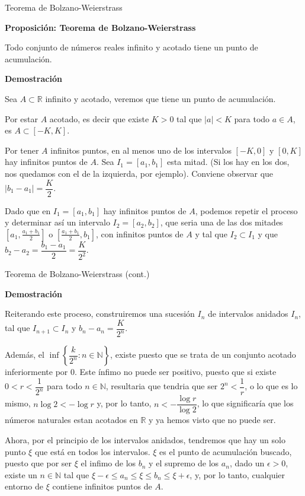\documentclass[
  ignorenonframetext,
]{beamer}
\begin{document}
\begin{frame}{Teorema de Bolzano-Weierstrass}
\protect\hypertarget{teorema-de-bolzano-weierstrass}{}

\textbf{Proposición: Teorema de Bolzano-Weierstrass}

Todo conjunto de números reales infinito y acotado tiene un punto de
acumulación.

\textbf{Demostración}

Sea \(A\subset \mathbb{R}\) infinito y acotado, veremos que tiene un
punto de acumulación.

Por estar \(A\) acotado, es decir que existe \(K>0\) tal que \(|a|<K\)
para todo \(a \in A\), es \(A \subset [-K,K]\).

Por tener \(A\) infinitos puntos, en al menos uno de los intervalos
\([-K,0]\) y \([0,K]\) hay infinitos puntos de \(A\). Sea
\(I_1 =[a_1,b_1]\) esta mitad. (Si los hay en los dos, nos quedamos con
el de la izquierda, por ejemplo). Conviene observar que
\(|b_1-a_1|=\dfrac{K}{2}\).

Dado que en \(I_1 =[a_1,b_1]\) hay infinitos puntos de \(A\), podemos
repetir el proceso y determinar así un intervalo \(I_2 = [a_2,b_2]\),
que seria una de las dos mitades \([a_1, \frac{a_1+b_1}{2}]\) o
\([\frac{a_1+b_1}{2},b_1]\), con infinitos puntos de \(A\) y tal que
\(I_2 \subset I_1\) y que
\(b_2-a_2= \dfrac{b_1 - a_1}{2}= \dfrac{K}{2^2}\).

\end{frame}

\begin{frame}{Teorema de Bolzano-Weierstrass (cont.)}
\protect\hypertarget{teorema-de-bolzano-weierstrass-cont.}{}

\textbf{Demostración}

Reiterando este proceso, construiremos una sucesión \(I_n\) de
intervalos anidados \(I_n\), tal que \(I_{n+1} \subset I_n\) y
\(b_n-a_n = \dfrac{K}{2^n}\).

Además, el \(\inf \left\{\dfrac{k}{2^n}: n \in \mathbb{N} \right\}\),
existe puesto que se trata de un conjunto acotado inferiormente por
\(0\). Este ínfimo no puede ser positivo, puesto que si existe
\(0 < r <\dfrac{1}{2^n}\) para todo \(n \in \mathbb{N}\), resultaria que
tendria que ser \(2^n < \dfrac{1}{r}\), o lo que es lo mismo,
\(n \log 2 <-\log r\) y, por lo tanto, \(n < -\dfrac{\log r}{\log 2}\),
lo que significaría que los números naturales estan acotados en
\(\mathbb{R}\) y ya hemos visto que no puede ser.

Ahora, por el principio de los intervalos anidados, tendremos que hay un
solo punto \(\xi\) que está en todos los intervalos. \(\xi\) es el punto
de acumulación buscado, puesto que por ser \(\xi\) el infimo de los
\(b_n\) y el supremo de los \(a_n\), dado un \(\epsilon >0\), existe un
\(n \in \mathbb{N}\) tal que
\(\xi-\epsilon \leq a_n \leq \xi \leq b_n \leq \xi+ \epsilon\), y, por
lo tanto, cualquier entorno de \(\xi\) contiene infinitos puntos de
\(A\).

\end{frame}
\end{document}
